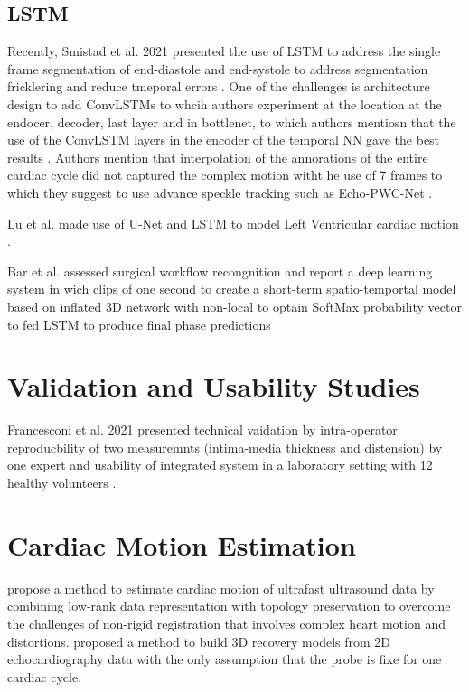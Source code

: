 

\subsection{LSTM}
Recently, Smistad et al. 2021 presented the use of LSTM to address the single frame segmentation of end-diastole and end-systole to address segmentation fricklering and reduce tmeporal errors \cite{smistad2021-C-IUS}.
One of the challenges is architecture design to add ConvLSTMs to whcih authors experiment at the location at the endocer, decoder, last layer and in bottlenet, to which authors mentiosn that the use of the ConvLSTM layers in the encoder of the temporal NN gave the best results \cite{smistad2021-C-IUS}.
Authors mention that interpolation of the annorations of the entire cardiac cycle did not captured the complex motion witht he use of 7 frames to which they suggest to use advance speckle tracking such as Echo-PWC-Net  \cite{ostvik2021-TMI}.

Lu et al. made use of U-Net and LSTM to model Left Ventricular cardiac motion \cite{lu2020-MIUA}.

Bar et al. assessed surgical workflow recongnition and report a deep learning system in wich clips of one second to create a short-term spatio-temportal model based on inflated 3D network with non-local to optain SoftMax probability vector to fed LSTM to produce final phase predictions \cite{Bar2020}

\section{Validation and Usability Studies}
Francesconi et al. 2021 presented technical vaidation by intra-operator reproducbility of two measuremnts (intima-media thickness and distension) by one expert and usability of integrated system in a laboratory setting with 12 healthy volunteers \cite{francesconi2021}.

\section{Cardiac Motion Estimation}
\cite{aviles2017} propose a method to estimate cardiac motion of ultrafast ultrasound data by combining low-rank data representation with topology preservation to
overcome the challenges of non-rigid registration that involves complex heart motion and distortions.
\cite{ahn2022} proposed a method to build 3D recovery models from 2D echocardiography data with the only assumption that the probe is fixe for one cardiac cycle.


